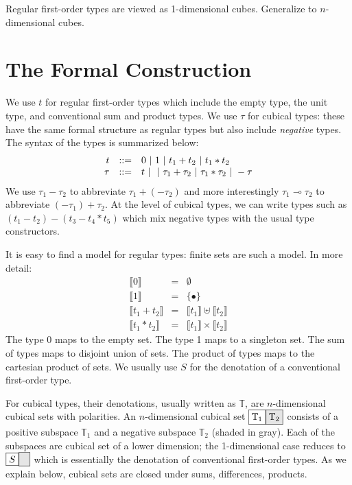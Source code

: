 \documentclass[authoryear,preprint]{sigplanconf}
\newcommand{\lolli}{\multimap}
\newcommand{\cubt}{\mathbb{T}}
\newcommand{\den}[1]{\llbracket #1 \rrbracket}
\newcommand{\nodet}[2]{\fcolorbox{black}{white}{$#1$}\fcolorbox{black}{gray!20}{$#2$}}
\begin{document}
Regular first-order types are viewed as 1-dimensional cubes. Generalize to
$n$-dimensional cubes. 

\section{The Formal Construction} 

We use $t$ for regular first-order types which include the empty type, the
unit type, and conventional sum and product types.  We use $\tau$ for cubical
types: these have the same formal structure as regular types but also include
\emph{negative} types. The syntax of the types is summarized below:
\[\begin{array}{rcl}
t &::=& 0 ~|~ 1 ~|~ t_1 + t_2 ~|~ t_1 * t_2 \\
\tau &::=& t ~|~ 
      ~|~ \tau_1 + \tau_2
      ~|~ \tau_1 * \tau_2
      ~|~ - \tau
\end{array}\]
We use $\tau_1 - \tau_2$ to abbreviate $\tau_1 + (- \tau_2)$ and more
interestingly $\tau_1 \lolli \tau_2$ to abbreviate $(- \tau_1) + \tau_2$. At
the level of cubical types, we can write types such as
$(t_1-t_2)-(t_3-t_4*t_5)$ which mix negative types with the usual type
constructors.

It is easy to find a model for regular types: finite sets are such a
model. In more detail:
\[\begin{array}{rcl}
\den{0} &=& \emptyset \\
\den{1} &=& \{ \bullet \} \\
\den{t_1 + t_2} &=& \den{t_1} \uplus \den{t_2} \\
\den{t_1 * t_2} &=& \den{t_1} \times \den{t_2} 
\end{array}\]
The type 0 maps to the empty set. The type 1 maps to a singleton set. The sum
of types maps to disjoint union of sets. The product of types maps to the
cartesian product of sets. We usually use $S$ for the denotation of a
conventional first-order type.

For cubical types, their denotations, usually written as $\cubt$, are
$n$-dimensional cubical sets with polarities. An $n$-dimensional cubical set
$\nodet{\cubt_1}{\cubt_2}$ consists of a positive subspace $\cubt_1$ and a
negative subspace $\cubt_2$ (shaded in gray). Each of the subspaces are
cubical set of a lower dimension; the 1-dimensional case reduces to
$\nodet{S}{\phantom{\emptyset}}$ which is essentially the denotation of
conventional first-order types. As we explain below, cubical sets are closed
under sums, differences, products.
\end{document}
